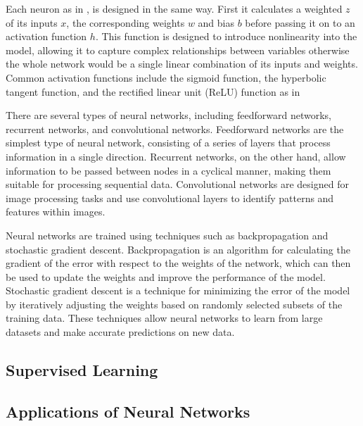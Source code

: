 

Each neuron as in , is designed in the same way. First it calculates a weighted $z$ of its inputs $x$, the corresponding weights $w$ and bias $b$ before passing it on to an activation function $h$. This function is designed to introduce nonlinearity into the model, allowing it to capture complex relationships between variables otherwise the whole network would be a single linear combination of its inputs and weights. Common activation functions include the sigmoid function, the hyperbolic tangent function, and the rectified linear unit (ReLU) function as in 



There are several types of neural networks, including feedforward networks, recurrent networks, and convolutional networks. Feedforward networks are the simplest type of neural network, consisting of a series of layers that process information in a single direction. Recurrent networks, on the other hand, allow information to be passed between nodes in a cyclical manner, making them suitable for processing sequential data. Convolutional networks are designed for image processing tasks and use convolutional layers to identify patterns and features within images.

Neural networks are trained using techniques such as backpropagation and stochastic gradient descent. Backpropagation is an algorithm for calculating the gradient of the error with respect to the weights of the network, which can then be used to update the weights and improve the performance of the model. Stochastic gradient descent is a technique for minimizing the error of the model by iteratively adjusting the weights based on randomly selected subsets of the training data. These techniques allow neural networks to learn from large datasets and make accurate predictions on new data.

\subsection{Supervised Learning}

\subsection{Applications of Neural Networks}


